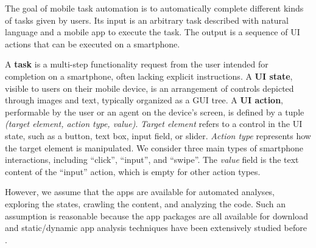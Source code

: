 The goal of mobile task automation is to automatically complete different kinds of tasks given by users. Its input is an arbitrary task described with natural language and a mobile app to execute the task. The output is a sequence of UI actions that can be executed on a smartphone. 

A \textbf{task} is a multi-step functionality request from the user intended for completion on a smartphone, often lacking explicit instructions. 
A \textbf{UI state}, visible to users on their mobile device, is an arrangement of controls depicted through images and text, typically organized as a GUI tree. %
A \textbf{UI action}, performable by the user or an agent on the device's screen, is defined by a tuple \textit{(target element, action type, value)}. \textit{Target element} refers to a control in the UI state, such as a button, text box, input field, or slider. \textit{Action type} represents how the target element is manipulated. We consider three main types of smartphone interactions, including ``click'', ``input'', and ``swipe''. The \textit{value} field is the text content of the ``input'' action, which is empty for other action types.

However, we assume that the apps are available for automated analyses, \eg exploring the states, crawling the content, and analyzing the code. Such an assumption is reasonable because the app packages are all available for download and static/dynamic app analysis techniques have been extensively studied before \cite{droidbot, Caiipa, li2019humanoid, VDfarms}.
\vspace{-0.13cm}
